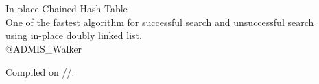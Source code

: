 \begin{titlepage}


\vspace*{120truept}
\begin{center}
  \leavevmode\\\leavevmode\\ %
  \vspace{30truept}
  \huge{In-place Chained Hash Table}\\ %
  \large{One of the fastest algorithm for successful search and unsuccessful search\\using in-place doubly linked list.}\\ %
\vspace{100truept}
\leavevmode \newline %
\leavevmode \newline %
\LARGE{@ADMIS\_Walker}\\ %
\end{center}

\vspace*{\fill} %
\begin{flushright}
  Compiled on \number\year/\number\month/\number\day.
\end{flushright}


\end{titlepage}
